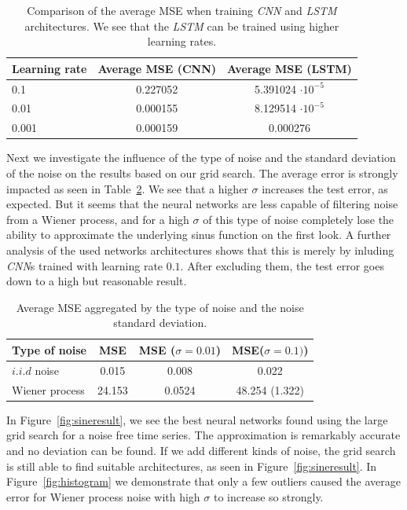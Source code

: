 \documentclass{article}
\begin{document}
\begin{table}
    \centering
    \begin{tabular}{l|c|c}
        Learning rate & Average MSE (CNN) & Average MSE (LSTM)       \\
        \hline
        0.1           & 0.227052          & 5.391024 $\cdot 10^{-5}$ \\
        0.01          & 0.000155          & 8.129514 $\cdot 10^{-5}$ \\
        0.001         & 0.000159          & 0.000276                 \\
    \end{tabular}
    \caption{Comparison of the average MSE when training \emph{CNN} and
        \emph{LSTM} architectures. We see that the \emph{LSTM} can be trained
        using higher learning rates.}
    \label{tab:cnn_training}
\end{table}

Next we investigate the influence of the type of noise
and the standard deviation of the noise on the results 
based on our grid search. The average error is
strongly impacted as seen in Table~\ref{tab:wiener_iid}. We see that
a higher $\sigma$ increases the test error, as expected. But it seems that the 
neural networks are less capable of filtering noise from a Wiener process, and 
for a high $\sigma$ of this type of noise completely lose the ability to 
approximate the underlying sinus function on the first look. A further analysis
of the used networks architectures shows that this is merely by inluding 
\emph{CNN}s trained with learning rate $0.1$. After excluding them, the test 
error goes down to a high but reasonable result.

\begin{table}
    \centering
    \begin{tabular}{l|ccc}
        Type of noise & MSE & MSE ($\sigma=0.01$) & MSE($\sigma=0.1)$) \\
        \hline
        $i.i.d$ noise &   0.015 & 0.008  &  0.022 \\
        Wiener process & 24.153 & 0.0524 & 48.254 (1.322) \\
    \end{tabular}
    \caption{Average MSE aggregated by the type of noise and the noise
        standard deviation.}
    \label{tab:wiener_iid}
\end{table}

In Figure~\ref{fig:sineresult}, we see the best neural networks found using 
the large grid search for a noise free time series. The approximation is 
remarkably accurate and no deviation can be found. If we add different kinds of 
noise, the grid search is still able to find suitable architectures, 
as seen in Figure~\ref{fig:sineresult}. In Figure~\ref{fig:histogram}
we demonstrate that only a few outliers caused the average error 
for Wiener process noise with high $\sigma$ to increase so strongly.
\end{document}
